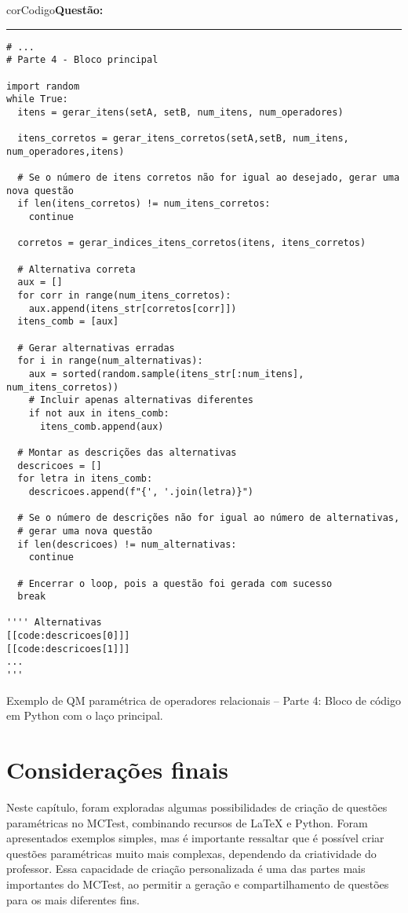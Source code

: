 \begin{listing}[!ht]
    \begin{myboxCode}{corCodigo}{\textbf{Questão: }}\vspace{3mm}
    \hrule
    \begin{verbatim}
# ...
# Parte 4 - Bloco principal

import random
while True:
  itens = gerar_itens(setA, setB, num_itens, num_operadores)

  itens_corretos = gerar_itens_corretos(setA,setB, num_itens, num_operadores,itens)

  # Se o número de itens corretos não for igual ao desejado, gerar uma nova questão
  if len(itens_corretos) != num_itens_corretos:
    continue
  
  corretos = gerar_indices_itens_corretos(itens, itens_corretos)

  # Alternativa correta
  aux = []
  for corr in range(num_itens_corretos):
    aux.append(itens_str[corretos[corr]])
  itens_comb = [aux]

  # Gerar alternativas erradas
  for i in range(num_alternativas):
    aux = sorted(random.sample(itens_str[:num_itens], num_itens_corretos))
    # Incluir apenas alternativas diferentes
    if not aux in itens_comb:
      itens_comb.append(aux)

  # Montar as descrições das alternativas
  descricoes = []
  for letra in itens_comb:
    descricoes.append(f"{', '.join(letra)}") 

  # Se o número de descrições não for igual ao número de alternativas, 
  # gerar uma nova questão
  if len(descricoes) != num_alternativas:
    continue

  # Encerrar o loop, pois a questão foi gerada com sucesso
  break

'''' Alternativas
[[code:descricoes[0]]]
[[code:descricoes[1]]]
...
'''
\end{verbatim}
\end{myboxCode}
\caption{Exemplo de QM paramétrica de operadores relacionais -- Parte 4: Bloco de código em Python com o laço principal.}
\label{lst:questaoQM_Extra1_parte4}
\end{listing}


\section{Considerações finais}

Neste capítulo, foram exploradas algumas possibilidades de criação de questões paramétricas no MCTest, combinando recursos de \LaTeX{} e Python. Foram apresentados exemplos simples, mas é importante ressaltar que é possível criar questões paramétricas muito mais complexas, dependendo da criatividade do professor. Essa capacidade de criação personalizada é uma das partes mais importantes do MCTest, ao permitir a geração e compartilhamento de questões para os mais diferentes fins.

